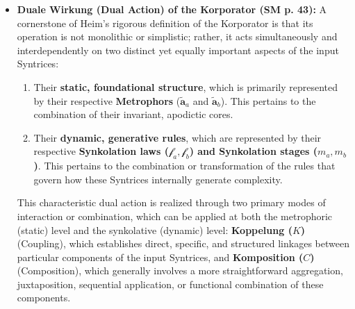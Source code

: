 \documentclass[12pt]{article}
\newcommand{\metrophor}{\bm{\widetilde{a}}}
\newcommand{\synkolator}{\mathcal{f}}
\newcommand{\synkolationsstufe}{m}
\begin{document}
\begin{itemize}
    \item \textbf{Duale Wirkung (Dual Action) of the Korporator (SM p. 43):}
    A cornerstone of Heim's rigorous definition of the Korporator is that its operation is not monolithic or simplistic; rather, it acts simultaneously and interdependently on two distinct yet equally important aspects of the input Syntrices:
    \begin{enumerate}
        \item Their \textbf{static, foundational structure}, which is primarily represented by their respective \textbf{Metrophors} (\( \metrophor_a \) and \( \metrophor_b \)). This pertains to the combination of their invariant, apodictic cores.
        \item Their \textbf{dynamic, generative rules}, which are represented by their respective \textbf{Synkolation laws (\( \synkolator_a, \synkolator_b \)) and Synkolation stages (\( \synkolationsstufe_a, \synkolationsstufe_b \))}. This pertains to the combination or transformation of the rules that govern how these Syntrices internally generate complexity.
    \end{enumerate}
    This characteristic dual action is realized through two primary modes of interaction or combination, which can be applied at both the metrophoric (static) level and the synkolative (dynamic) level: \textbf{Koppelung (\( K \))} (Coupling), which establishes direct, specific, and structured linkages between particular components of the input Syntrices, and \textbf{Komposition (\( C \))} (Composition), which generally involves a more straightforward aggregation, juxtaposition, sequential application, or functional combination of these components.


\end{itemize}
\end{document}
